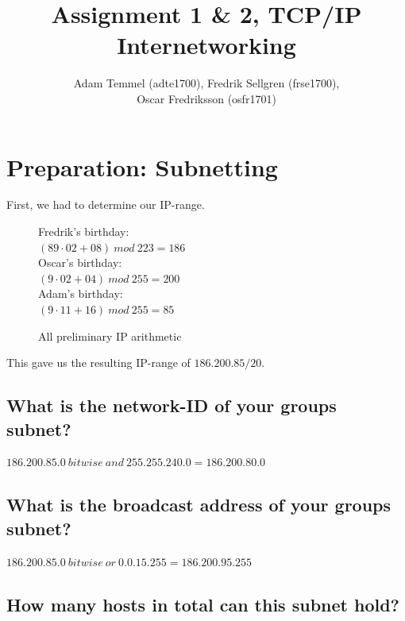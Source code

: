 \documentclass[a4paper, titlepage,12pt]{article}
\title{Assignment 1 \& 2, TCP/IP Internetworking}
\author{Adam Temmel (adte1700), Fredrik Sellgren (frse1700),\\Oscar Fredriksson (osfr1701)}
\begin{document}
	\maketitle
	\section{Preparation: Subnetting}\label{sec:introduction}

	First, we had to determine our IP-range.\\

	\begin{figure}[h!]
		\begin{center}
			Fredrik's birthday:\\
			$(89\cdot02+08) \ mod \ 223 = 186$\\
			Oscar's birthday:\\
			$(9\cdot02+04) \ mod \ 255 = 200$\\
			Adam's birthday:\\
			$(9\cdot11+16) \ mod \ 255 = 85$\\
			\caption{All preliminary IP arithmetic}
		\end{center}
	\end{figure}

	This gave us the resulting IP-range of $186.200.85/20$.

	\subsection{What is the network-ID of your groups subnet?}

		\begin{center}
			$186.200.85.0 \ bitwise \ and \ 255.255.240.0 = 186.200.80.0$\\
		\end{center}

	\subsection{What is the broadcast address of your groups subnet?}

		\begin{center}
			$186.200.85.0 \ bitwise \ or \ 0.0.15.255 = 186.200.95.255$\\
		\end{center}

	\subsection{How many hosts in total can this subnet hold?}
\end{document}
